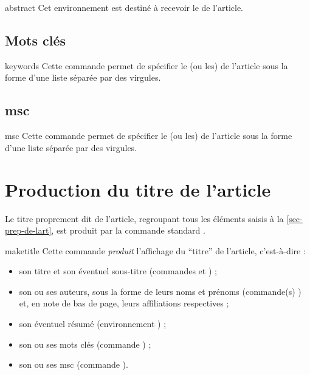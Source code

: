 \documentclass[french,nolocaltoc]{nwejmart}
\newtheorem[title=Fait,style=definition]{fact}
\begin{document}
\begin{docEnvironment}[doc description=\mandatory,doclang/environment content=résumé]{abstract}{}
  Cet environnement est destiné à recevoir le  de l'article.
\end{docEnvironment}

\subsection{Mots clés}

\begin{docCommand}[doc description=\mandatory]{keywords}{}
  Cette commande permet de spécifier le (ou les)  de
  l'article sous la forme d'une liste séparée par des virgules.
\end{docCommand}

\subsection{\texorpdfstring{\acrfull{msc}}{MSC}}

\begin{docCommand}[doc description=\mandatory]{msc}{}
  Cette commande permet de spécifier le (ou les)  de
  l'article sous la forme d'une liste séparée par des virgules.
\end{docCommand}

\section{Production du titre de l'article}
\label{sec-creation-du-titre}

Le titre proprement dit de l'article, regroupant tous les éléments saisis à la
\vref{sec-prep-de-lart}, est produit par la commande standard
.

\begin{docCommand}[doc description=\mandatory]{maketitle}{}
  Cette commande \emph{produit} l'affichage du \enquote{titre} de l'article,
  c'est-à-dire :
  \begin{itemize}
  \item son titre et son éventuel sous-titre (commandes  et
    ) ;
  \item son ou ses auteurs, sous la forme de leurs noms et prénoms (commande(s)
    ) et, en note de bas de page, leurs affiliations respectives ;
  \item son éventuel résumé (environnement ) ;
  \item son ou ses mots clés (commande ) ;
  \item son ou ses \acrshort{msc} (commande ).
  \end{itemize}
\end{docCommand}
\end{document}
